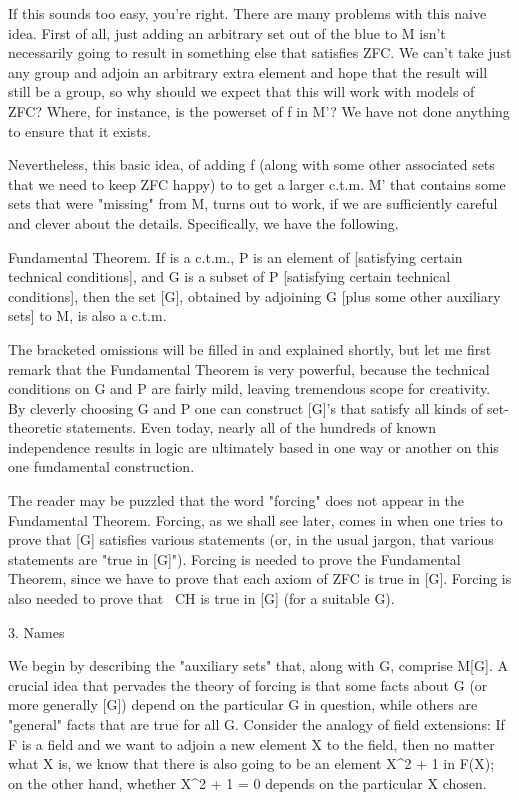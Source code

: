 \documentclass[10pt]{article}
\theoremstyle{definition}
\begin{document}
If this sounds too easy, you're right.  There are many problems with this
naive idea.  First of all, just adding an arbitrary set out of the blue to M
isn't necessarily going to result in something else that satisfies ZFC.  We
can't take just any group and adjoin an arbitrary extra element and hope
that the result will still be a group, so why should we expect that this
will work with models of ZFC?  Where, for instance, is the powerset of f in
M'?  We have not done anything to ensure that it exists.

Nevertheless, this basic idea, of adding f (along with some other associated
sets that we need to keep ZFC happy) to  to get a larger c.t.m. M' that
contains some sets that were "missing" from M, turns out to work, if we are
sufficiently careful and clever about the details.  Specifically, we have
the following.

Fundamental Theorem.  If  is a c.t.m., P is an element of  [satisfying
certain technical conditions], and G is a subset of P [satisfying certain
technical conditions], then the set [G], obtained by adjoining G [plus some
other auxiliary sets] to M, is also a c.t.m.

The bracketed omissions will be filled in and explained shortly, but let me
first remark that the Fundamental Theorem is very powerful, because the
technical conditions on G and P are fairly mild, leaving tremendous scope
for creativity.  By cleverly choosing G and P one can construct [G]'s that
satisfy all kinds of set-theoretic statements.  Even today, nearly all of
the hundreds of known independence results in logic are ultimately based in
one way or another on this one fundamental construction.

The reader may be puzzled that the word "forcing" does not appear in the
Fundamental Theorem.  Forcing, as we shall see later, comes in when one
tries to prove that [G] satisfies various statements (or, in the usual
jargon, that various statements are "true in [G]").  Forcing is needed to
prove the Fundamental Theorem, since we have to prove that each axiom of ZFC
is true in [G].  Forcing is also needed to prove that ~CH is true in [G]
(for a suitable G).


3. Names

We begin by describing the "auxiliary sets" that, along with G, comprise
M[G].  A crucial idea that pervades the theory of forcing is that some facts
about G (or more generally [G]) depend on the particular G in question,
while others are "general" facts that are true for all G.  Consider the
analogy of field extensions: If F is a field and we want to adjoin a new
element X to the field, then no matter what X is, we know that there is
also going to be an element X^2 + 1 in F(X); on the other hand, whether
X^2 + 1 = 0 depends on the particular X chosen.
\end{document}
